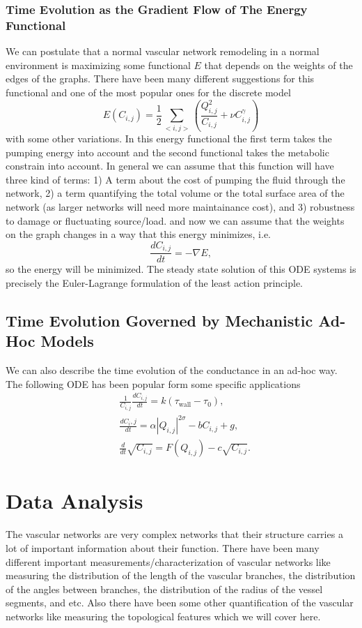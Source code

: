 \documentclass[10pt,a4paper,twocolumn]{article}
\begin{document}
	\subsubsection{Time Evolution as the Gradient Flow of The Energy Functional}
	We can postulate that a normal vascular network remodeling in a normal environment is maximizing some functional $ E $ that depends on the weights of the edges of the graphs. There have been many different suggestions for this functional and one of the most popular ones for the discrete model
	\[ E(C_{i,j}) = \frac12 \sum_{<i,j>}(\frac{Q_{i,j}^2}{C_{i,j}} + \nu C_{i,j}^\gamma)  \]
	with some other variations. In this energy functional the first term takes the pumping energy into account and the second functional takes the metabolic constrain into account. In general we can assume that this function will have three kind of terms: 1) A term about the cost of pumping the fluid through the network, 2) a term quantifying the total volume or the total surface area of the network (as larger networks will need more maintainance cost), and 3) robustness to damage or fluctuating source/load.
	and now we can assume that the weights on the graph changes in a way that this energy minimizes, i.e.
	\[ \frac{d C_{i,j}}{dt} = - \nabla E, \]
	so the energy will be minimized. The steady state solution of this ODE systems is precisely the Euler-Lagrange formulation of the least action principle.
	
	
	\subsection{Time Evolution Governed by Mechanistic Ad-Hoc Models}
	We can also describe the time evolution of the conductance in an ad-hoc way. The following ODE has been popular form some specific applications
	\begin{align*}
		&\frac{1}{C_{i,j}}\frac{dC_{i,j}}{dt} = k (\tau_\text{wall} - \tau_0),\\
		&\frac{dC_i,j}{dt} = \alpha |Q_{i,j}|^{2\sigma} - b C_{i,j} + g, \\
		&\frac{d}{dt}\sqrt{C_{i,j}} = F(Q_{i,j}) - c \sqrt{C_{i,j}}.
	\end{align*}
	
	
	
	\section{Data Analysis}
	The vascular networks are very complex networks that their structure carries a lot of important information about their function. There have been many different important measurements/characterization of vascular networks like measuring the distribution of the length of the vascular branches, the distribution of the angles between branches, the distribution of the radius of the vessel segments, and etc. Also there have been some other quantification of the vascular networks like measuring the topological features which we will cover here.
	
\end{document}
